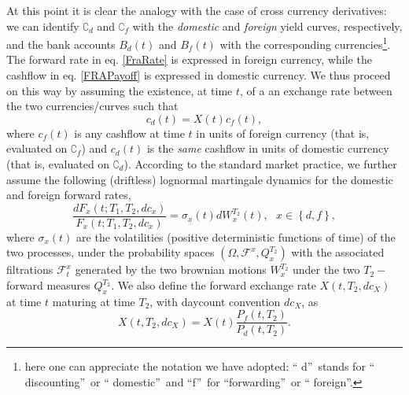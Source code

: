 \documentclass[11pt,reqno]{amsart}
\begin{document}
At this point it is clear the analogy with the case of cross currency
derivatives: we can identify $\complement _{d}$ and $\complement _{f}$ with
the \textit{domestic} and \textit{foreign} yield curves, respectively, and
the bank accounts $B_{d}\left( t\right) $ and $B_{f}\left( t\right) $ with
the corresponding currencies\footnote{%
here one can appreciate the notation we have adopted: \textquotedblleft
d\textquotedblright\ stands for \textquotedblleft
discounting\textquotedblright\ or \textquotedblleft
domestic\textquotedblright\ and \textquotedblleft f\textquotedblright\ for
\textquotedblleft forwarding\textquotedblright\ or \textquotedblleft
foreign\textquotedblright .}. The forward rate in eq. \ref{FraRate} is
expressed in foreign currency, while the cashflow in eq. \ref{FRAPayoff} is
expressed in domestic currency. We thus proceed on this way by assuming the
existence, at time $t$, of a an exchange rate between the two
currencies/curves such that 
\begin{equation}
c_{d}\left( t\right) =X\left( t\right) c_{f}\left( t\right) ,
\end{equation}%
where $c_{f}\left( t\right) $ is any cashflow at time $t$ in units of
foreign currency (that is, evaluated on $\complement _{f}$) and $c_{d}\left(
t\right) $ is the \textit{same} cashflow in units of domestic currency (that
is, evaluated on $\complement _{d}$). According to the standard market
practice, we further assume the following (driftless) lognormal martingale
dynamics for the domestic and foreign forward rates, 
\begin{equation}
\frac{dF_{x}\left( t;T_{1},T_{2},dc_{x}\right) }{F_{x}\left(
t;T_{1},T_{2},dc_{x}\right) }=\sigma _{x}\left( t\right)
dW_{x}^{T_{2}}\left( t\right) ,\text{ \ \ }x\in \left\{ d,f\right\} ,
\end{equation}%
where $\sigma _{x}\left( t\right) $ are the volatilities (positive
deterministic functions of time) of the two processes, under the probability
spaces $\left( \Omega ,\mathcal{F}^{x},Q_{x}^{T_{2}}\right) $ with the
associated filtrations $\mathcal{F}_{t}^{x}$ generated by the two brownian
motions $W_{x}^{T_{2}}$ under the two $T_{2}-$forward measures $%
Q_{x}^{T_{2}} $. We also define the forward exchange rate $X\left(
t,T_{2},dc_{X}\right) $ at time $t$ maturing at time $T_{2}$, with daycount
convention $dc_{X}$, as%
\begin{equation}
X\left( t,T_{2},dc_{X}\right) =X\left( t\right) \frac{P_{f}\left(
t,T_{2}\right) }{P_{d}\left( t,T_{2}\right) }.
\end{equation}%
\end{document}
